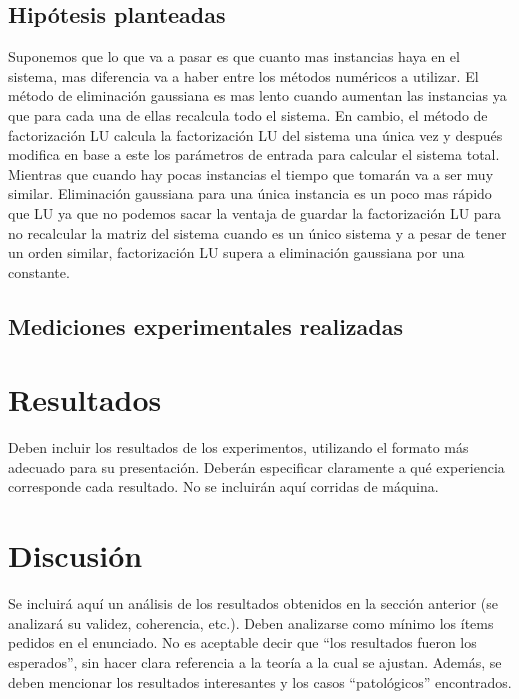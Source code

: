 \documentclass[11pt, a4paper, spanish]{article}
\theoremstyle{plain}
\theoremstyle{remark}
\begin{document}
  \subsection{Hipótesis planteadas}

    Suponemos que lo que va a pasar es que cuanto mas instancias haya en el sistema, mas diferencia va a haber entre los métodos numéricos a utilizar. El método de eliminación gaussiana es mas lento cuando aumentan las instancias ya que para cada una de ellas recalcula todo el sistema. En cambio, el método de factorización LU calcula la factorización LU del sistema una única vez y después modifica en base a este los parámetros de entrada para calcular el sistema total. Mientras que cuando hay pocas instancias el tiempo que tomarán va a ser muy similar. Eliminación gaussiana para una única instancia es un poco mas rápido que LU ya que no podemos sacar la ventaja de guardar la factorización LU para no recalcular la matriz del sistema cuando es un único sistema y a pesar de tener un orden similar, factorización LU supera a eliminación gaussiana por una constante.

  \subsection{Mediciones experimentales realizadas}

\section{Resultados}

  {\color{Gray} Deben incluir los resultados de los experimentos, utilizando el formato más adecuado para su presentación. Deberán especificar claramente a qué experiencia corresponde cada resultado. No se incluirán aquí corridas de máquina.}

\section{Discusión}

  {\color{Gray} Se incluirá aquí un análisis de los resultados obtenidos en la sección anterior (se analizará su validez, coherencia, etc.). Deben analizarse como mínimo los ítems pedidos en el enunciado. No es aceptable decir que ``los resultados fueron los esperados'', sin hacer clara referencia a la teoría a la cual se ajustan. Además, se deben mencionar los resultados interesantes y los casos ``patológicos'' encontrados.}
\end{document}
